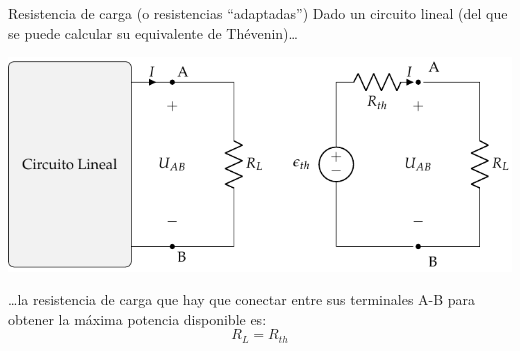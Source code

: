 \documentclass[aspectratio=169, xcolor={usenames,svgnames,dvipsnames}]{beamer}
\begin{document}
\begin{frame}{Resistencia de carga \hspace{3mm}(o resistencias ``adaptadas'')}
    Dado un circuito lineal (del que se puede calcular su equivalente de Thévenin)\ldots{}
    \begin{center}
        \includegraphics[height=0.45\textheight]{../figs/EquivalenteThevenin_R.pdf}
    \end{center}
    
    \ldots{}la \alert{resistencia de carga} que hay que conectar entre sus terminales A-B para obtener la máxima potencia disponible es:
    \[
      \boxed{R_L = R_{th}}
    \]
\end{frame}

\end{document}
